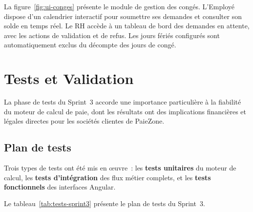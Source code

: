 La figure~\ref{fig:ui-conges} présente le module de gestion des congés.
L'Employé dispose d'un calendrier interactif pour soumettre ses demandes
et consulter son solde en temps réel. Le RH accède à un tableau de bord
des demandes en attente, avec les actions de validation et de refus.
Les jours fériés configurés sont automatiquement exclus du décompte
des jours de congé.

\section{Tests et Validation}
\label{sec:s3-tests}

La phase de tests du Sprint~3 accorde une importance particulière
à la fiabilité du moteur de calcul de paie, dont les résultats ont
des implications financières et légales directes pour les sociétés
clientes de PaieZone.

\subsection{Plan de tests}

Trois types de tests ont été mis en \oe{}uvre~: les \textbf{tests
unitaires} du moteur de calcul, les \textbf{tests
d'intégration} des flux métier complets, et les \textbf{tests
fonctionnels} des interfaces Angular.

Le tableau~\ref{tab:tests-sprint3} présente le plan de tests du Sprint~3.

